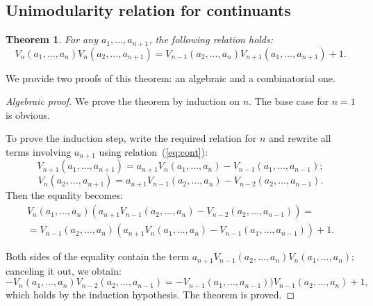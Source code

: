 \documentclass[a4paper,11pt]{amsart}
\theoremstyle{plain}
\newtheorem{theorem}{Theorem}[section]
\theoremstyle{remark}
\theoremstyle{definition}
\numberwithin{equation}{section}
\numberwithin{figure}{section}
\begin{document}
\subsection{Unimodularity relation for continuants}\label{ssec:unimod}


\begin{theorem}\label{thm:unimod}
For any $a_1,\dots,a_{n+1}$, the following relation holds:
\begin{equation}\label{eq:unimod}
    V_{n}(a_1,\dots,a_n)V_n(a_2,\dots,a_{n+1})=V_{n-1}(a_2,\dots,a_n)V_{n+1}(a_1,\dots,a_{n+1})+1.
\end{equation}
\end{theorem}

We provide two proofs of this theorem: an algebraic and a combinatorial one.

\begin{proof}[Algebraic proof]
We prove the theorem by induction on $n$. The base case for $n=1$ is obvious.

To prove the induction step, write the required relation for $n$ and rewrite all terms involving $a_{n+1}$ using relation~(\ref{eq:cont}):
\[
V_{n+1}(a_1,\dots,a_{n+1})=a_{n+1}V_n(a_1,\dots,a_n)-V_{n-1}(a_1,\dots,a_{n-1});
\]
\[
V_n(a_2,\dots,a_{n+1})=a_{n+1}V_{n-1}(a_2,\dots,a_n)-V_{n-2}(a_2,\dots,a_{n-1}).
\]
Then the equality becomes:
\begin{multline*}
V_{n}(a_1,\dots,a_n)(a_{n+1}V_{n-1}(a_2,\dots,a_n)-V_{n-2}(a_2,\dots,a_{n-1}))=\\=V_{n-1}(a_2,\dots,a_n)(a_{n+1}V_n(a_1,\dots,a_n)-V_{n-1}(a_1,\dots,a_{n-1}))+1.
\end{multline*}

Both sides of the equality contain the term $a_{n+1}V_{n-1}(a_2,\dots,a_n)V_{n}(a_1,\dots,a_n)$; canceling it out, we obtain:
\[
-V_{n}(a_1,\dots,a_n)V_{n-2}(a_2,\dots,a_{n-1})=-V_{n-1}(a_1,\dots,a_{n-1}))V_{n-1}(a_2,\dots,a_n)+1,
\]
which holds by the induction hypothesis. The theorem is proved.
\end{proof}
\end{document}
